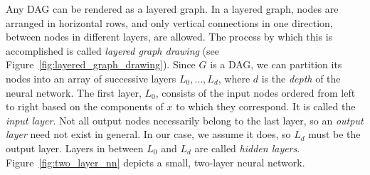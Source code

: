 \documentclass[11pt,a4paper]{article}
\numberwithin{equation}{section}
\begin{document}
Any DAG can be rendered as a layered graph. In a layered graph, nodes are
arranged in horizontal rows, and only vertical connections in one direction,
between nodes in different layers, are allowed. The process by which this is
accomplished is called \emph{layered graph drawing} (see
Figure~\ref{fig:layered_graph_drawing}). Since $G$ is a DAG, we can partition
its nodes into an array of successive layers $L_0, \ldots, L_d$, where $d$ is
the \emph{depth} of the neural network. The first layer, $L_0$, consists of the
input nodes ordered from left to right based on the components of $x$ to which
they correspond. It is called the \emph{input layer}. Not all output nodes
necessarily belong to the last layer, so an \emph{output layer} need not exist
in general. In our case, we assume it does, so $L_d$ must be the output layer.
Layers in between $L_0$ and $L_d$ are called \emph{hidden layers}.
Figure~\ref{fig:two_layer_nn} depicts a small, two-layer neural network.
\end{document}
